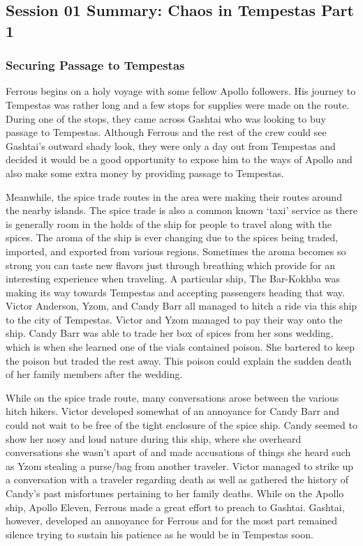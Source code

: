 \subsection{Session 01 Summary: Chaos in Tempestas Part 1}

\subsubsection{Securing Passage to Tempestas}

Ferrous begins on a holy voyage with some fellow Apollo followers. His journey to Tempestas was rather long and a few stops for supplies were made on the route. During one of the stops, they came across Gashtai who was looking to buy passage to Tempestas. Although Ferrous and the rest of the crew could see Gashtai's outward shady look, they were only a day out from Tempestas and decided it would be a good opportunity to expose him to the ways of Apollo and also make some extra money by providing passage to Tempestas. 

Meanwhile, the spice trade routes in the area were making their routes around the nearby islands. The spice trade is also a common known `taxi' service as there is generally room in the holds of the ship for people to travel along with the spices. The aroma of the ship is ever changing due to the spices being traded, imported, and exported from various regions. Sometimes the aroma becomes so strong you can taste new flavors just through breathing which provide for an interesting experience when traveling. A particular ship, The Bar-Kokhba was making its way towards Tempestas and accepting passengers heading that way. Victor Anderson, Yzom, and Candy Barr all managed to hitch a ride via this ship to the city of Tempestas. Victor and Yzom managed to pay their way onto the ship. Candy Barr was able to trade her box of spices from her sons wedding, which is when she learned one of the vials contained poison. She bartered to keep the poison but traded the rest away. This poison could explain the sudden death of her family members after the wedding. 

While on the spice trade route, many conversations arose between the various hitch hikers. Victor developed somewhat of an annoyance for Candy Barr and could not wait to be free of the tight enclosure of the spice ship. Candy seemed to show her nosy and loud nature during this ship, where she overheard conversations she wasn't apart of and made accusations of things she heard such as Yzom stealing a purse/bag from another traveler. Victor managed to strike up a conversation with a traveler regarding death as well as gathered the history of Candy's past misfortunes pertaining to her family deaths. While on the Apollo ship, Apollo Eleven, Ferrous made a great effort to preach to Gashtai. Gashtai, however, developed an annoyance for Ferrous and for the most part remained silence trying to sustain his patience as he would be in Tempestas soon. 

